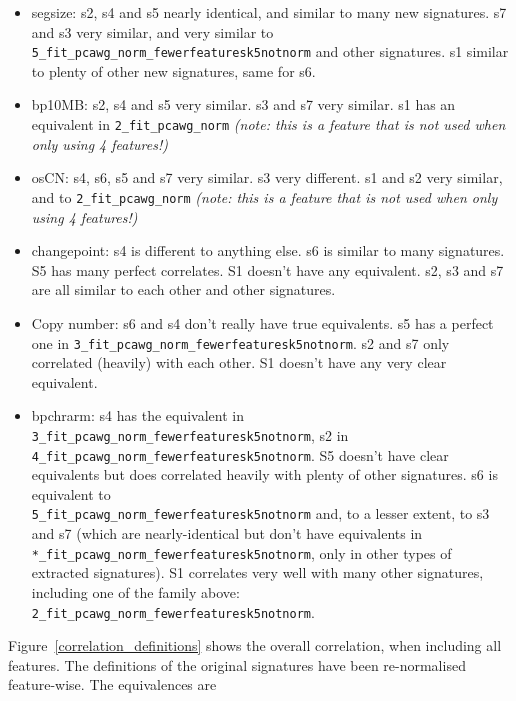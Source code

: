 \documentclass[11pt,a4paper,roman]{article}
\begin{document}
\begin{itemize}
\item segsize: s2, s4 and s5 nearly identical, and similar to many new signatures. s7 and s3 very similar, and very similar to \verb|5_fit_pcawg_norm_fewerfeaturesk5notnorm| and other signatures. s1 similar to plenty of other new signatures, same for s6.
\item bp10MB: s2, s4 and s5 very similar. s3 and s7 very similar. s1 has an equivalent in \verb|2_fit_pcawg_norm| \emph{(note: this is a feature that is not used when only using 4 features!)}
\item osCN: s4, s6, s5 and s7 very similar. s3 very different. s1 and s2 very similar, and to \verb|2_fit_pcawg_norm| \emph{(note: this is a feature that is not used when only using 4 features!)}
\item changepoint: s4 is different to anything else. s6 is similar to many signatures. S5 has many perfect correlates. S1 doesn't have any equivalent. s2, s3 and s7 are all similar to each other and other signatures.
\item Copy number: s6 and s4 don't really have true equivalents. s5 has a perfect one in \verb|3_fit_pcawg_norm_fewerfeaturesk5notnorm|. s2 and s7 only correlated (heavily) with each other. S1 doesn't have any very clear equivalent.
\item bpchrarm: s4 has the equivalent in \verb|3_fit_pcawg_norm_fewerfeaturesk5notnorm|, s2 in \verb|4_fit_pcawg_norm_fewerfeaturesk5notnorm|. S5 doesn't have clear equivalents but does correlated heavily with plenty of other signatures. s6 is equivalent to\\ \verb|5_fit_pcawg_norm_fewerfeaturesk5notnorm| and, to a lesser extent, to s3 and s7 (which are nearly-identical but don't have equivalents in \verb|*_fit_pcawg_norm_fewerfeaturesk5notnorm|, only in other types of extracted signatures). S1 correlates very well with many other signatures, including one of the family above: \verb|2_fit_pcawg_norm_fewerfeaturesk5notnorm|.
\end{itemize}

Figure~\ref{correlation_definitions} shows the overall correlation, when including all features. The definitions of the original signatures have been re-normalised feature-wise. The equivalences are
\end{document}
